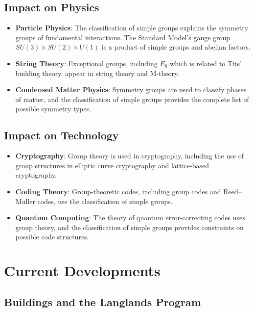 \subsection{Impact on Physics}

\begin{itemize}
\item \textbf{Particle Physics}: The classification of simple groups explains the symmetry groups of fundamental interactions. The Standard Model's gauge group $SU(3) \times SU(2) \times U(1)$ is a product of simple groups and abelian factors.

\item \textbf{String Theory}: Exceptional groups, including $E_8$ which is related to Tits' building theory, appear in string theory and M-theory.

\item \textbf{Condensed Matter Physics}: Symmetry groups are used to classify phases of matter, and the classification of simple groups provides the complete list of possible symmetry types.
\end{itemize}

\subsection{Impact on Technology}

\begin{itemize}
\item \textbf{Cryptography}: Group theory is used in cryptography, including the use of group structures in elliptic curve cryptography and lattice-based cryptography.

\item \textbf{Coding Theory}: Group-theoretic codes, including group codes and Reed--Muller codes, use the classification of simple groups.

\item \textbf{Quantum Computing}: The theory of quantum error-correcting codes uses group theory, and the classification of simple groups provides constraints on possible code structures.
\end{itemize}

\section{Current Developments}

\subsection{Buildings and the Langlands Program}

